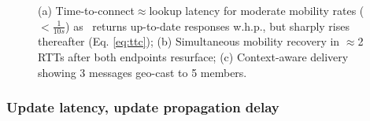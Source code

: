 \begin{figure}[t]
\caption{(a) Time-to-connect$\approx$lookup latency for moderate mobility rates ($<\frac{1}{10s}$)  as \auspice\ returns up-to-date responses w.h.p., but sharply rises thereafter (Eq. \ref{eq:ttc}); (b) Simultaneous mobility recovery in $\approx$2 RTTs after both endpoints resurface; (c) Context-aware delivery showing 3 messages  geo-cast to 5 members.}
\label{fig:end2end}
\end{figure}




\vsp
\subsubsection{Update latency, update propagation delay}
\label{sec:updatelatency}

